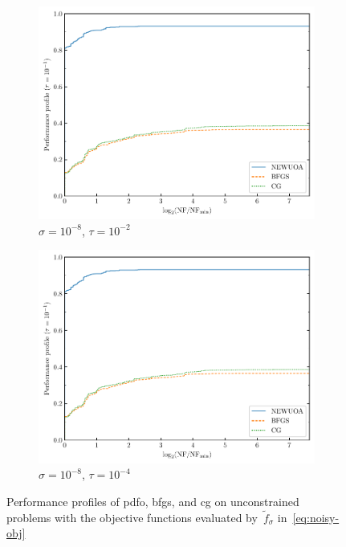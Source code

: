 \documentclass[
    smallextended,  %
    final,          %
]{svjour3}
\newcommand{\obj}{f}
\begin{document}
\begin{figure}[htbp]
\begin{subfigure}{.45\textwidth}
        \includegraphics[width=\textwidth,page=2]{perf-noisy-bfgs_cg_pdfo-50-8.pdf}
        \caption{$\sigma = 10^{-8}$, $\tau = 10^{-2}$}
    \end{subfigure}
    \hfill
    \begin{subfigure}{.45\textwidth}
        \centering
        \includegraphics[width=\textwidth,page=4]{perf-noisy-bfgs_cg_pdfo-50-8.pdf}
        \caption{$\sigma = 10^{-8}$, $\tau = 10^{-4}$}
    \end{subfigure}
    \caption{Performance profiles of \gls{pdfo}, \gls{bfgs}, and \gls{cg} on unconstrained problems
    with the objective functions evaluated by~$\tilde{\obj}_\sigma$ in~\eqref{eq:noisy-obj}}
    \label{fig:noise}
\end{figure}
\end{document}
